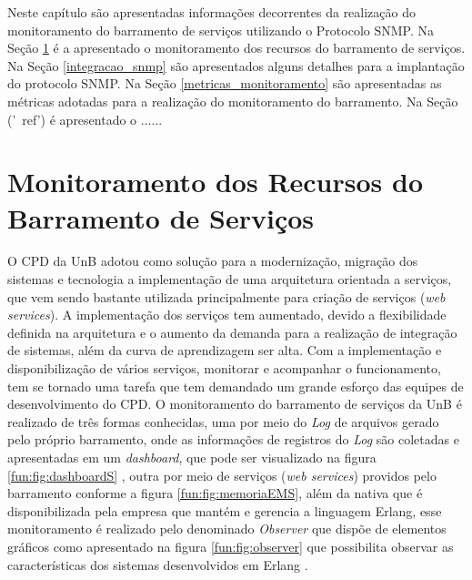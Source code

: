 \label{monitoramento_servicos}

Neste capítulo são apresentadas informações decorrentes da realização do monitoramento do barramento de serviços utilizando o Protocolo \acrshort{SNMP}. Na Seção \ref{recursos_monitoramento} é a apresentado o monitoramento dos recursos do barramento de serviços. Na Seção \ref{integracao_snmp} são apresentados alguns detalhes para a implantação do protocolo \acrshort{SNMP}. Na Seção \ref{metricas_monitoramento} são apresentadas as métricas adotadas para a realização do monitoramento do barramento. Na Seção ('\ ref') é apresentado o ......

\section{Monitoramento dos Recursos do Barramento de Serviços}%
\label{recursos_monitoramento}

O \acrshort{CPD} da \acrshort{UnB} adotou como solução para a modernização, migração dos sistemas e tecnologia a implementação de uma arquitetura orientada a serviços, que vem sendo bastante utilizada principalmente para criação de serviços (\textit{web services}). A implementação dos serviços tem aumentado, devido a flexibilidade definida na arquitetura e o aumento da demanda para a realização de integração de sistemas, além da curva de aprendizagem ser alta. Com a implementação e disponibilização de  vários serviços, monitorar e acompanhar o funcionamento, tem se tornado uma tarefa que tem demandado um grande esforço das equipes de 
desenvolvimento do \acrshort{CPD}. O monitoramento do barramento de serviços da \acrshort{UnB} é realizado de três formas conhecidas, uma por meio do \textit{Log} de arquivos gerado pelo próprio barramento, onde as informações de registros do \textit{Log} são coletadas e apresentadas em um \textit{dashboard}, que pode ser visualizado na figura \ref{fun:fig:dashboardS} \cite{filgueirasmonitoramento}, outra por meio de serviços (\textit{web services}) providos pelo barramento conforme a figura \ref{fun:fig:memoriaEMS}, além da nativa que é disponibilizada pela empresa que mantém e gerencia a linguagem Erlang, esse monitoramento é realizado pelo denominado \textit{Observer} que dispõe de elementos gráficos como apresentado na figura \ref{fun:fig:observer} que possibilita observar as características dos sistemas desenvolvidos em Erlang \cite{ericssonAB2002-2019}. 

